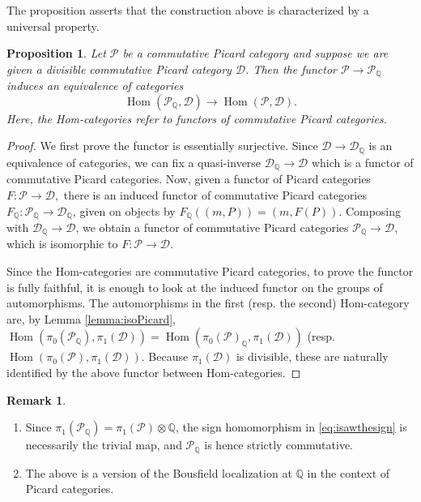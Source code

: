 \documentclass[11pt]{article}
\newcommand{\resp}{resp.\xspace}
\newcommand{\skpt}{\smallskip}
\theoremstyle{plain}
\newtheorem{proposition}[theorem]{Proposition}
\theoremstyle{definition}
\newtheorem{remark}[theorem]{Remark}
\newcommand{\QBbb}{\mathbb Q}
\newcommand{\Dcal}{\mathcal D}
\newcommand{\Pcal}{\mathcal P}
\DeclareMathOperator{\Hom}{Hom}
\begin{document}
The proposition asserts that the construction above is characterized by a universal property.

\begin{proposition}\label{prop:rationalization}
Let $\Pcal$ be a commutative Picard category and suppose we are given a divisible commutative Picard category $\Dcal$. Then the functor $\Pcal\to\Pcal_{\QBbb}$ induces an equivalence of categories\vspace*{-3pt}\enlargethispage{\baselineskip}
\begin{displaymath}
\Hom(\Pcal_\QBbb, \Dcal) \to \Hom(\Pcal, \Dcal).
\end{displaymath}
Here, the Hom-categories refer to functors of commutative Picard categories.
\end{proposition}
\begin{proof}
We first prove the functor is essentially surjective. Since $\Dcal\to\Dcal_{\QBbb}$ is an equivalence of categories, we can fix a quasi-inverse $\Dcal_{\QBbb}\to\Dcal$ which is a functor of commutative Picard categories. Now, given a functor of Picard categories $F: \Pcal \to \Dcal, $ there is an induced functor of commutative Picard categories $F_\QBbb: \Pcal_\QBbb \to \Dcal_\QBbb$, given on objects by $F_\QBbb((m, P)) = (m, F(P))$. Composing with $\Dcal_{\QBbb}\to\Dcal$, we obtain a functor of commutative Picard categories $\Pcal_{\QBbb}\to\Dcal$, which is isomorphic to $F: \Pcal \to \Dcal$.

Since the Hom-categories are commutative Picard categories, to prove the functor is fully faithful, it is enough to look at the induced functor on the groups of automorphisms. The automorphisms in the first (\resp the second) Hom-category are, by Lemma \ref{lemma:isoPicard},
$\Hom(\pi_0(\Pcal_\QBbb), \pi_1(\Dcal)) = \Hom(\pi_0(\Pcal)_\QBbb, \pi_1(\Dcal))$ (\resp $\Hom(\pi_0(\Pcal), \pi_1(\Dcal))$. Because $\pi_{1}(\Dcal)$ is divisible, these are naturally identified by the above functor between Hom-categories.
\end{proof}

\skpt
\begin{remark}\label{rem:Q-Bousfield}
\begin{enumerate}
\item \label{item:Q-Bousfield-1} Since $\pi_1(\Pcal_\QBbb) = \pi_1(\Pcal)\otimes\QBbb$, the sign homomorphism in \eqref{eq:isawthesign} is necessarily the trivial map, and $\Pcal_\QBbb$ is hence strictly commutative.
\item \label{item:Q-Bousfield-2} The above is a version of the Bousfield localization at $\QBbb$ in the context of Picard categories.
\end{enumerate}
\end{remark}
\end{document}
